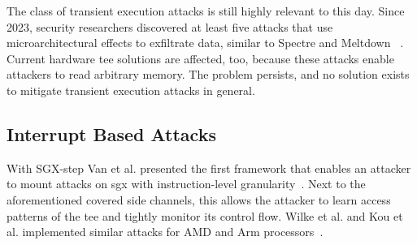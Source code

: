 

The class of transient execution attacks is still highly relevant to this day.
Since 2023, security researchers discovered at least five attacks that use
microarchitectural effects to exfiltrate data, similar to Spectre and Meltdown~
\cite{ormandy2023zenbleed,trujillo2023inception,
moghimi2023downfall,ragab_ghostrace_2024, wilke2024tdxdown}. Current hardware
\gls{tee} solutions are affected, too, because these attacks enable attackers to
read arbitrary memory. The problem persists, and no solution exists to mitigate
transient execution attacks in general.\\

\subsection{Interrupt Based Attacks}
\label{sec:20:interrupt_sca}
With SGX-step Van et al. presented the first framework that enables an attacker
to mount attacks on \gls{sgx} with instruction-level
granularity~\cite{van2017sgx}. Next to the aforementioned covered side channels,
this allows the attacker to learn access patterns of the \gls{tee} and tightly
monitor its control flow. Wilke et al. and Kou et al. implemented similar
attacks for AMD and Arm processors~\cite{wilke2023sev, kou2021load}.\\

